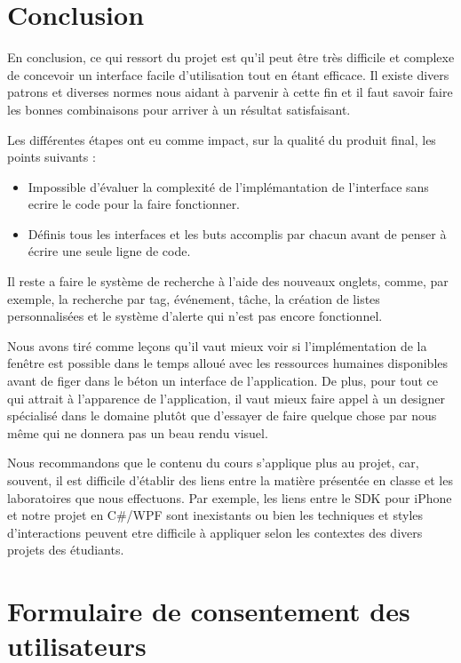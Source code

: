 \documentclass[letterpaper, oneside, 12pt, these, creativecommons]{thETS}
\begin{document}
\chapter{Conclusion}

En conclusion, ce qui ressort du projet est qu'il peut être très difficile et complexe de concevoir un interface facile d'utilisation tout en étant efficace. Il existe divers patrons et diverses normes nous aidant à parvenir à cette fin et il faut savoir faire les bonnes combinaisons pour arriver à un résultat satisfaisant. 

Les différentes étapes ont eu comme impact, sur la qualité du produit final, les points suivants :

\begin{itemize}
	\item Impossible d'évaluer la complexité de l'implémantation de l'interface sans ecrire le code pour la faire fonctionner.
	\item Définis tous les interfaces et les buts accomplis par chacun avant de penser à écrire une seule ligne de code.
\end{itemize}

Il reste a faire le système de recherche à l'aide des nouveaux onglets, comme, par exemple, la recherche par tag, événement, tâche, la création de listes personnalisées et le système d'alerte qui n'est pas encore fonctionnel.

Nous avons tiré comme leçons qu'il vaut mieux voir si l'implémentation de la fenêtre est possible dans le temps alloué avec les ressources humaines disponibles avant de figer dans le béton un interface de l'application. De plus, pour tout ce qui attrait à l'apparence de l'application, il vaut mieux faire appel à un designer spécialisé dans le domaine plutôt que d'essayer de faire quelque chose par nous même qui ne donnera pas un beau rendu visuel.

Nous recommandons que le contenu du cours s'applique plus au projet, car, souvent, il est difficile d'établir des liens entre la matière présentée en classe et les laboratoires que nous effectuons. Par exemple, les liens entre le SDK pour iPhone et notre projet en C\#/WPF sont inexistants ou bien les techniques et styles d'interactions peuvent etre difficile à appliquer selon les contextes des divers projets des étudiants.

\appendix
\multiannexe

\chapter{Formulaire de consentement des utilisateurs}
\end{document}
